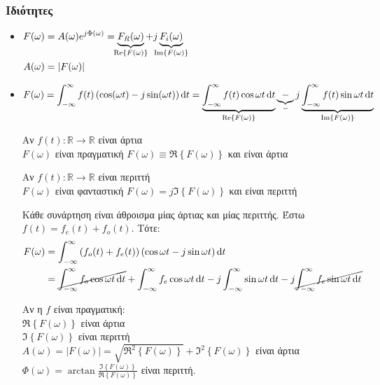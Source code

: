     \subsubsection{Ιδιότητες}
     \begin{itemize}

     \item\(
     \begin{aligned}[t]
     F(\omega)&= A(\omega )e^{j\Phi(\omega )} =
     \underbrace{F_R(\omega )}_{\mathclap{\Re\left\lbrace F(\omega ) \right\rbrace}}
     +j\underbrace{F_i(\omega )}_{\mathclap{\Im\left\lbrace F(\omega ) \right\rbrace}}
     \\ A(\omega )&=\left| F(\omega ) \right|
     \end{aligned}\)
     \item \( \displaystyle
     F(\omega )=\int_{-\infty}^{\infty} f(t)\left(\cos(\omega t)-j\sin(\omega t)\right)
     \dif t = \underbrace{\int_{-\infty}^{\infty} f(t)\cos\omega t\dif t}_{%
        \Re\left\lbrace F(\omega ) \right\rbrace
        }
        \underbrace{-}_{-}
        j \underbrace{\int_{-\infty}^{\infty} f(t)\sin\omega t\dif t}_{%
            \Im\left\lbrace F(\omega ) \right\rbrace
            }
     \)

     Αν \( f(t):\mathbb R \to\mathbb R  \) είναι άρτια\\
     \( F(\omega ) \) είναι πραγματική \quad \(
     F(\omega ) \equiv \Re\left\lbrace F(\omega ) \right\rbrace
      \) και είναι άρτια

     Αν \( f(t):\mathbb R \to\mathbb R  \) είναι περιττή\\
     \( F(\omega ) \) είναι φανταστική \quad \(
     F(\omega ) = j\Im \left\lbrace F(\omega) \right\rbrace
      \) και είναι περιττή

     Κάθε συνάρτηση είναι άθροισμα μίας άρτιας και μίας περιττής. Έστω
     \( f(t) = f_e(t)+f_o(t) \). Τότε:
     \begin{align*}
     F(\omega ) &= \int_{-\infty}^{\infty} \left(
     f_o(t)+f_e(t)
     \right)(\cos\omega t -j\sin \omega t)\mathop{}\!\mathrm{d} t
     \\ &= \cancel{\int_{-\infty}^{\infty} f_o\cos\omega t\mathop{}\!\mathrm{d} t}
     + \int_{-\infty}^{\infty} f_e\cos\omega t\mathop{}\!\mathrm{d} t
     - j\int_{-\infty}^{\infty} \sin\omega t\mathop{}\!\mathrm{d} t
     - j \cancel{\int_{-\infty}^{\infty} f_e\sin\omega t\mathop{}\!\mathrm{d} t }
     \end{align*}

     Αν η \( f \) είναι πραγματική: \\
     \( \Re\left\lbrace F(\omega ) \right\rbrace \) είναι άρτια \\
     \( \Im\left\lbrace F(\omega ) \right\rbrace \) είναι περιττή \\
     \( A(\omega)=\left|F(\omega )\right| =
     \sqrt{\Re^2\left\lbrace F(\omega ) \right\rbrace}
     +\Im^2\left\lbrace F(\omega) \right\rbrace
      \) είναι άρτια\\
      \( \Phi(\omega) =\arctan
      \frac{\Im\left\lbrace F(\omega) \right\rbrace}%
      {\Re\left\lbrace F(\omega ) \right\rbrace}
       \) είναι περιττή.


\end{itemize}
